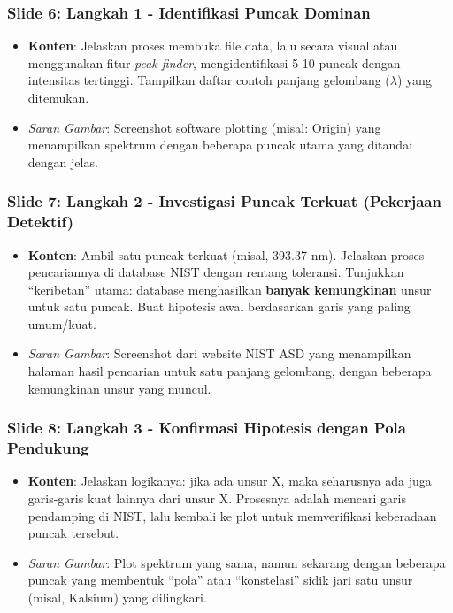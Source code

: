 \documentclass[12pt, a4paper]{article}
\begin{document}
\subsubsection*{Slide 6: Langkah 1 - Identifikasi Puncak Dominan}
\begin{itemize}
    \item \textbf{Konten}: Jelaskan proses membuka file data, lalu secara visual atau menggunakan fitur \textit{peak finder}, mengidentifikasi 5-10 puncak dengan intensitas tertinggi. Tampilkan daftar contoh panjang gelombang ($\lambda$) yang ditemukan.
    \item \textit{Saran Gambar}: Screenshot software plotting (misal: Origin) yang menampilkan spektrum dengan beberapa puncak utama yang ditandai dengan jelas.
\end{itemize}

\subsubsection*{Slide 7: Langkah 2 - Investigasi Puncak Terkuat (Pekerjaan Detektif)}
\begin{itemize}
    \item \textbf{Konten}: Ambil satu puncak terkuat (misal, 393.37 nm). Jelaskan proses pencariannya di database NIST dengan rentang toleransi. Tunjukkan ``keribetan'' utama: database menghasilkan \textbf{banyak kemungkinan} unsur untuk satu puncak. Buat hipotesis awal berdasarkan garis yang paling umum/kuat.
    \item \textit{Saran Gambar}: Screenshot dari website NIST ASD yang menampilkan halaman hasil pencarian untuk satu panjang gelombang, dengan beberapa kemungkinan unsur yang muncul.
\end{itemize}

\subsubsection*{Slide 8: Langkah 3 - Konfirmasi Hipotesis dengan Pola Pendukung}
\begin{itemize}
    \item \textbf{Konten}: Jelaskan logikanya: jika ada unsur X, maka seharusnya ada juga garis-garis kuat lainnya dari unsur X. Prosesnya adalah mencari garis pendamping di NIST, lalu kembali ke plot untuk memverifikasi keberadaan puncak tersebut.
    \item \textit{Saran Gambar}: Plot spektrum yang sama, namun sekarang dengan beberapa puncak yang membentuk ``pola'' atau ``konstelasi'' sidik jari satu unsur (misal, Kalsium) yang dilingkari.
\end{itemize}
\end{document}

